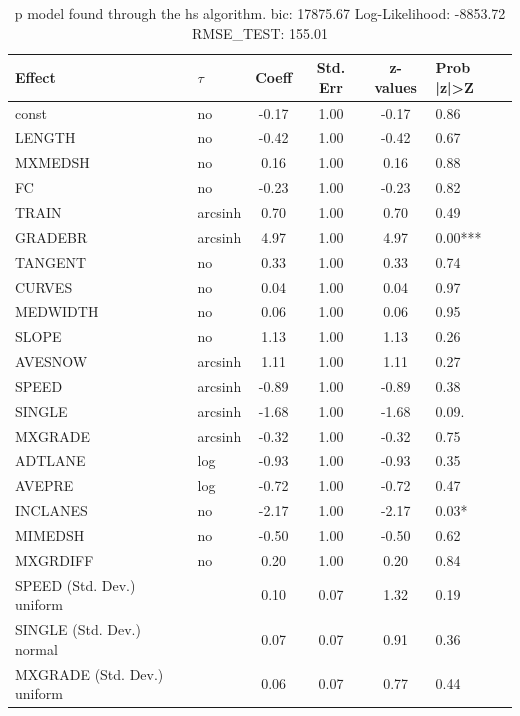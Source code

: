 \begin{table}
	\caption{p model found through the hs algorithm. bic: 17875.67 Log-Likelihood: -8853.72 RMSE_TEST: 155.01}
	\begin{center}
		\begin{tabular}{|l|l|c|c|c|l|}
			\hline
			Effect & $\tau$ & Coeff & Std. Err & z-values & Prob |z|>Z \\
			\hline
			const & no & -0.17 & 1.00 & -0.17 & 0.86 \\
			\hline
			LENGTH & no & -0.42 & 1.00 & -0.42 & 0.67 \\
			\hline
			MXMEDSH & no & 0.16 & 1.00 & 0.16 & 0.88 \\
			\hline
			FC & no & -0.23 & 1.00 & -0.23 & 0.82 \\
			\hline
			TRAIN & arcsinh & 0.70 & 1.00 & 0.70 & 0.49 \\
			\hline
			GRADEBR & arcsinh & 4.97 & 1.00 & 4.97 & 0.00*** \\
			\hline
			TANGENT & no & 0.33 & 1.00 & 0.33 & 0.74 \\
			\hline
			CURVES & no & 0.04 & 1.00 & 0.04 & 0.97 \\
			\hline
			MEDWIDTH & no & 0.06 & 1.00 & 0.06 & 0.95 \\
			\hline
			SLOPE & no & 1.13 & 1.00 & 1.13 & 0.26 \\
			\hline
			AVESNOW & arcsinh & 1.11 & 1.00 & 1.11 & 0.27 \\
			\hline
			SPEED & arcsinh & -0.89 & 1.00 & -0.89 & 0.38 \\
			\hline
			SINGLE & arcsinh & -1.68 & 1.00 & -1.68 & 0.09. \\
			\hline
			MXGRADE & arcsinh & -0.32 & 1.00 & -0.32 & 0.75 \\
			\hline
			ADTLANE & log & -0.93 & 1.00 & -0.93 & 0.35 \\
			\hline
			AVEPRE & log & -0.72 & 1.00 & -0.72 & 0.47 \\
			\hline
			INCLANES & no & -2.17 & 1.00 & -2.17 & 0.03* \\
			\hline
			MIMEDSH & no & -0.50 & 1.00 & -0.50 & 0.62 \\
			\hline
			MXGRDIFF & no & 0.20 & 1.00 & 0.20 & 0.84 \\
			\hline
			SPEED (Std. Dev.) uniform &  & 0.10 & 0.07 & 1.32 & 0.19 \\
			\hline
			SINGLE (Std. Dev.) normal &  & 0.07 & 0.07 & 0.91 & 0.36 \\
			\hline
			MXGRADE (Std. Dev.) uniform &  & 0.06 & 0.07 & 0.77 & 0.44 \\

\end{tabular}
\end{center}
\end{table}
